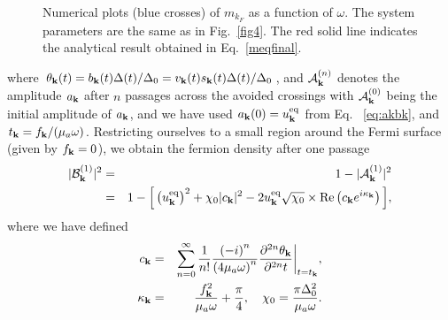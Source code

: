 \documentclass[a4paper,10pt]{report}
\begin{document}
\begin{figure}
\begin{center}
\end{center}
\caption{Numerical plots (blue crosses) of $m_{k_F}$
as a function of $\omega$. The system parameters are the same as in
Fig.\ \ref{fig4}. The red solid line indicates the analytical result
obtained in Eq.\ \ref{meqfinal}.} \label{fig:magcomp}
\end{figure}
where $\theta_{\bf k}(t) =  b_{\bf k}(t) \Delta(t)/\Delta_0=v_{\bf
k}(t)s_{\bf k}(t)\Delta(t)/\Delta_0$, and $\mathcal{A}^{(n)}_{\bf k}$ denotes the amplitude $a_{\bf k}$
after $n$ passages across the avoided crossings with
$\mathcal{A}^{(0)}_{\bf k}$ being the initial amplitude of $a_{\bf
k}$, and we have used $a_{\bf k}(0)=u^{\rm eq}_{\bf k}$ from Eq. \
\ref{eq:akbk}, and $t_{\bf k}= f_{\bf k}/(\mu_a \omega)$. Restricting ourselves to a small region around the Fermi surface (given by $f_{\bf k}=0$), we obtain the fermion density after one passage
\begin{eqnarray}
\label{eq:lzmod}
|\mathcal{B}^{(1)}_{\bf k}|^2 &=& 1 - |\mathcal{A}^{(1)}_{\bf k}|^2 \nonumber \\
    &=& 1-\Big[\left(u^{\rm eq}_{\bf k}\right)^2+\chi_0|c_{\bf k}|^2 - 2u^{\rm eq}_{\bf k}\sqrt{\chi_0}\times{\rm Re}\left(c_{\bf
k}e^{i\kappa_{\bf k}}\right)\Big],
\end{eqnarray}
where we have defined
\begin{eqnarray}
\label{eq:ckchieta} c_{\bf k} &=& \sum^\infty_{n=0} \frac{1}{n!}
\frac{\left(-i\right)^n} {\left(4\mu_a\omega\right)^n}
\frac{\partial^{2n}\theta_{\bf
k}} {\partial^{2n}t}\bigg|_{t=t_{\bf k}}, \nonumber\\
\kappa_{\bf k} &=& \frac{f^2_{\bf k}}{\mu_a\omega}+\frac{\pi}{4},
\quad \chi_0 = \frac{\pi\Delta^2_0}{\mu_a\omega}.
\end{eqnarray}
\end{document}
